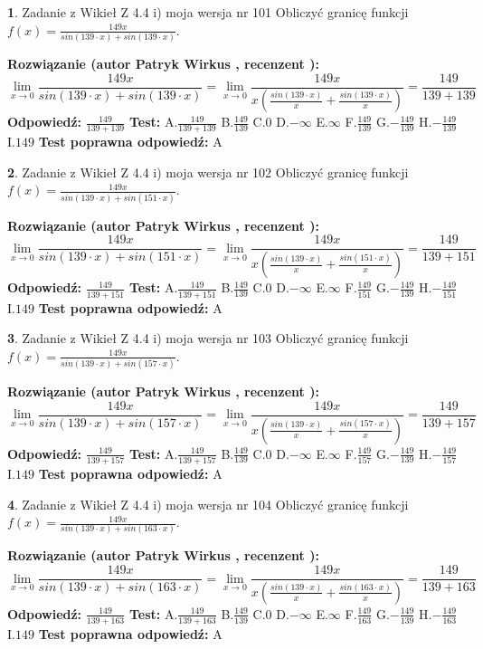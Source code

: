 \documentclass[12pt, a4paper]{article}
\theoremstyle{definition} %
\newtheorem{zad}{}
\newcommand{\zadStart}[1]{\begin{zad}#1\newline}
\newcommand{\zadStop}{\end{zad}}
\newcommand{\rozwStart}[2]{\noindent \textbf{Rozwiązanie (autor #1 , recenzent #2): }\newline}
\newcommand{\rozwStop}{\newline}
\newcommand{\odpStart}{\noindent \textbf{Odpowiedź:}\newline}
\newcommand{\odpStop}{\newline}
\newcommand{\testStart}{\noindent \textbf{Test:}\newline}
\newcommand{\testStop}{\newline}
\newcommand{\kluczStart}{\noindent \textbf{Test poprawna odpowiedź:}\newline}
\newcommand{\kluczStop}{\newline}
\begin{document}
\zadStart{Zadanie z Wikieł Z 4.4 i) moja wersja nr 101}
Obliczyć granicę funkcji $f(x)=\frac{149x}{sin(139\cdot x) +sin(139\cdot x)}$.
\zadStop
\rozwStart{Patryk Wirkus}{}
$$\lim\limits_{x\to 0}\frac{149x}{sin(139\cdot x) +sin(139\cdot x)}=\lim\limits_{x\to 0}\frac{149x}{x(\frac{sin(139\cdot x)}{x}+\frac{sin(139\cdot x)}{x})}=\frac{149}{139+139}$$
\rozwStop
\odpStart
$\frac{149}{139+139}$
\odpStop
\testStart
A.$\frac{149}{139+139}$
B.$\frac{149}{139}$
C.$0$
D.$-\infty$
E.$\infty$
F.$\frac{149}{139}$
G.$-\frac{149}{139}$
H.$-\frac{149}{139}$
I.$149$
\testStop
\kluczStart
A
\kluczStop



\zadStart{Zadanie z Wikieł Z 4.4 i) moja wersja nr 102}
Obliczyć granicę funkcji $f(x)=\frac{149x}{sin(139\cdot x) +sin(151\cdot x)}$.
\zadStop
\rozwStart{Patryk Wirkus}{}
$$\lim\limits_{x\to 0}\frac{149x}{sin(139\cdot x) +sin(151\cdot x)}=\lim\limits_{x\to 0}\frac{149x}{x(\frac{sin(139\cdot x)}{x}+\frac{sin(151\cdot x)}{x})}=\frac{149}{139+151}$$
\rozwStop
\odpStart
$\frac{149}{139+151}$
\odpStop
\testStart
A.$\frac{149}{139+151}$
B.$\frac{149}{139}$
C.$0$
D.$-\infty$
E.$\infty$
F.$\frac{149}{151}$
G.$-\frac{149}{139}$
H.$-\frac{149}{151}$
I.$149$
\testStop
\kluczStart
A
\kluczStop



\zadStart{Zadanie z Wikieł Z 4.4 i) moja wersja nr 103}
Obliczyć granicę funkcji $f(x)=\frac{149x}{sin(139\cdot x) +sin(157\cdot x)}$.
\zadStop
\rozwStart{Patryk Wirkus}{}
$$\lim\limits_{x\to 0}\frac{149x}{sin(139\cdot x) +sin(157\cdot x)}=\lim\limits_{x\to 0}\frac{149x}{x(\frac{sin(139\cdot x)}{x}+\frac{sin(157\cdot x)}{x})}=\frac{149}{139+157}$$
\rozwStop
\odpStart
$\frac{149}{139+157}$
\odpStop
\testStart
A.$\frac{149}{139+157}$
B.$\frac{149}{139}$
C.$0$
D.$-\infty$
E.$\infty$
F.$\frac{149}{157}$
G.$-\frac{149}{139}$
H.$-\frac{149}{157}$
I.$149$
\testStop
\kluczStart
A
\kluczStop



\zadStart{Zadanie z Wikieł Z 4.4 i) moja wersja nr 104}
Obliczyć granicę funkcji $f(x)=\frac{149x}{sin(139\cdot x) +sin(163\cdot x)}$.
\zadStop
\rozwStart{Patryk Wirkus}{}
$$\lim\limits_{x\to 0}\frac{149x}{sin(139\cdot x) +sin(163\cdot x)}=\lim\limits_{x\to 0}\frac{149x}{x(\frac{sin(139\cdot x)}{x}+\frac{sin(163\cdot x)}{x})}=\frac{149}{139+163}$$
\rozwStop
\odpStart
$\frac{149}{139+163}$
\odpStop
\testStart
A.$\frac{149}{139+163}$
B.$\frac{149}{139}$
C.$0$
D.$-\infty$
E.$\infty$
F.$\frac{149}{163}$
G.$-\frac{149}{139}$
H.$-\frac{149}{163}$
I.$149$
\testStop
\kluczStart
A
\kluczStop
\end{document}
